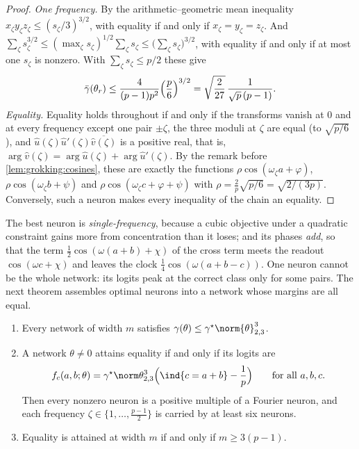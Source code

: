 \begin{refsection}
\begin{proof}
\emph{One frequency.} By the arithmetic--geometric mean inequality $x_\zeta y_\zeta z_\zeta\le(s_\zeta/3)^{3/2}$, with equality if and only if $x_\zeta=y_\zeta=z_\zeta$. And $\sum_\zeta s_\zeta^{3/2}\le(\max_\zeta s_\zeta)^{1/2}\sum_\zeta s_\zeta\le\bigl(\sum_\zeta s_\zeta\bigr)^{3/2}$, with equality if and only if at most one $s_\zeta$ is nonzero. With $\sum_\zeta s_\zeta\le p/2$ these give
\[
  \bar\gamma(\theta_r)\le\frac4{(p-1)p^2}\Bigl(\frac{p}{6}\Bigr)^{3/2}=\sqrt{\frac2{27}}\,\frac1{\sqrt p\,(p-1)} .
\]
\emph{Equality.} Equality holds throughout if and only if the transforms vanish at $0$ and at every frequency except one pair $\pm\zeta$, the three moduli at $\zeta$ are equal (to $\sqrt{p/6}$), and $\hat u(\zeta)\hat u'(\zeta)\overline{\hat v(\zeta)}$ is a positive real, that is, $\arg\hat v(\zeta)=\arg\hat u(\zeta)+\arg\hat u'(\zeta)$. By the remark before \cref{lem:grokking:cosines}, these are exactly the functions $\rho\cos(\omega_\zeta a+\varphi)$, $\rho\cos(\omega_\zeta b+\psi)$ and $\rho\cos(\omega_\zeta c+\varphi+\psi)$ with $\rho=\frac2p\sqrt{p/6}=\sqrt{2/(3p)}$. Conversely, such a neuron makes every inequality of the chain an equality.
\end{proof}

The best neuron is \emph{single-frequency}, because a cubic objective under a quadratic constraint gains more from concentration than it loses; and its phases \emph{add}, so that the term $\frac12\cos(\omega(a+b)+\chi)$ of the cross term meets the readout $\cos(\omega c+\chi)$ and leaves the clock $\frac14\cos(\omega(a+b-c))$. One neuron cannot be the whole network: its logits peak at the correct class only for some pairs. The next theorem assembles optimal neurons into a network whose margins are all equal.

\begin{theorem}\label{thm:grokking:maxmargin}
\leavevmode
\begin{enumerate}
\item Every network of width $m$ satisfies $\gamma(\theta)\le\gamma^\star\norm{\theta}_{2,3}^3$.
\item A network $\theta\ne0$ attains equality if and only if its logits are
\[
  f_c(a,b;\theta)=\gamma^\star\norm\theta_{2,3}^3\Bigl(\ind\{c=a+b\}-\frac1p\Bigr)\qquad\text{for all }a,b,c .
\]
Then every nonzero neuron is a positive multiple of a Fourier neuron, and each frequency $\zeta\in\{1,\dots,\frac{p-1}2\}$ is carried by at least six neurons.
\item Equality is attained at width $m$ if and only if $m\ge3(p-1)$.
\end{enumerate}
\end{theorem}


\end{refsection}
